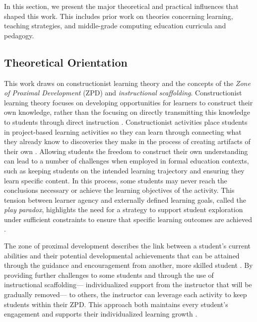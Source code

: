 \documentclass[sigconf,manuscript,review,anonymous]{acmart} %
\begin{document}
In this section, we present the major theoretical and practical influences that shaped this work. This includes prior work on theories concerning learning, teaching strategies, and middle-grade computing education curricula and pedagogy.

\subsection{Theoretical Orientation}
This work draws on constructionist learning theory and the concepts of the \textit{Zone of Proximal Development} (ZPD) and \textit{instructional scaffolding}. Constructionist learning theory focuses on developing opportunities for learners to construct their own knowledge, rather than the focusing on directly transmitting this knowledge to students through direct instruction \cite{Papert:1980}. Constructionist activities place students in project-based learning activities so they can learn through connecting what they already know to discoveries they make in the process of creating artifacts of their own \cite{papert1991situating, papert1993children}. Allowing students the freedom to construct their own understanding can lead to a number of challenges when employed in formal education contexts, such as keeping students on the intended learning trajectory and ensuring they learn specific content. In this process, some students may never reach the conclusions necessary or achieve the learning objectives of the activity. This tension between learner agency and externally defined learning goals, called the \textit{play paradox}, highlights the need for a strategy to support student exploration under sufficient constraints to ensure that specific learning outcomes are achieved \cite{noss1996windows}.

The zone of proximal development describes the link between a student’s current abilities and their potential developmental achievements that can be attained through the guidance and encouragement from another, more skilled student \cite{vygotsky1980mind}. By providing further challenges to some students and through the use of instructional scaffolding— individualized support from the instructor that will be gradually removed— to others, the instructor can leverage each activity to keep students within their ZPD. This approach both maintains every student’s engagement and supports their individualized learning growth \cite{nasir2006, wood1976role}.
\end{document}
